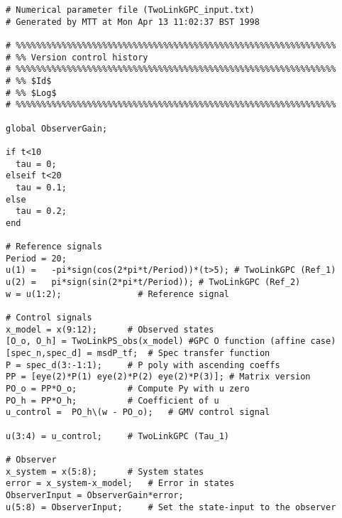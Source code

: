 \begin{verbatim}
# Numerical parameter file (TwoLinkGPC_input.txt)
# Generated by MTT at Mon Apr 13 11:02:37 BST 1998

# %%%%%%%%%%%%%%%%%%%%%%%%%%%%%%%%%%%%%%%%%%%%%%%%%%%%%%%%%%%%%%%
# %% Version control history
# %%%%%%%%%%%%%%%%%%%%%%%%%%%%%%%%%%%%%%%%%%%%%%%%%%%%%%%%%%%%%%%
# %% $Id$
# %% $Log$
# %%%%%%%%%%%%%%%%%%%%%%%%%%%%%%%%%%%%%%%%%%%%%%%%%%%%%%%%%%%%%%%

global ObserverGain;

if t<10
  tau = 0;
elseif t<20
  tau = 0.1;
else
  tau = 0.2;
end

# Reference signals
Period = 20;
u(1) =	 -pi*sign(cos(2*pi*t/Period))*(t>5); # TwoLinkGPC (Ref_1)
u(2) =	 pi*sign(sin(2*pi*t/Period)); # TwoLinkGPC (Ref_2)
w = u(1:2);			      # Reference signal

# Control signals
x_model = x(9:12);		# Observed states
[O_o, O_h] = TwoLinkPS_obs(x_model) #GPC O function (affine case)
[spec_n,spec_d] = msdP_tf;	# Spec transfer function
P = spec_d(3:-1:1);		# P poly with ascending coeffs
PP = [eye(2)*P(1) eye(2)*P(2) eye(2)*P(3)]; # Matrix version
PO_o = PP*O_o;			# Compute Py with u zero
PO_h = PP*O_h;			# Coefficient of u
u_control =  PO_h\(w - PO_o);	# GMV control signal

u(3:4) = u_control;		# TwoLinkGPC (Tau_1)

# Observer
x_system = x(5:8);		# System states
error = x_system-x_model;	# Error in states
ObserverInput = ObserverGain*error;
u(5:8) = ObserverInput;		# Set the state-input to the observer

\end{verbatim}
